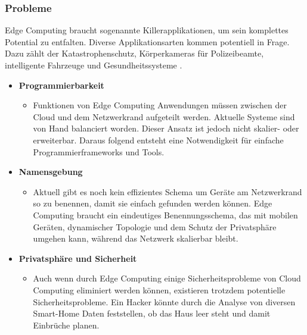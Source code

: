 \documentclass{sigchi}
\begin{document}
\subsubsection{Probleme}
Edge Computing braucht sogenannte Killerapplikationen, um sein komplettes Potential zu entfalten. Diverse Applikationsarten kommen potentiell in Frage. Dazu zählt der Katastrophenschutz, Körperkameras für Polizeibeamte, intelligente Fahrzeuge und Gesundheitssysteme \cite{promise-edge-computing:2016}.

\begin{itemize}
    \item \textbf{Programmierbarkeit}
    \begin{itemize}
        \item Funktionen von Edge Computing Anwendungen müssen zwischen der Cloud und dem Netzwerkrand aufgeteilt werden. Aktuelle Systeme sind von Hand balanciert worden. Dieser Ansatz ist jedoch nicht skalier- oder erweiterbar. Daraus folgend entsteht eine Notwendigkeit für einfache Programmierframeworks und Tools.
    \end{itemize}
    \item \textbf{Namensgebung}
        \begin{itemize}
            \item Aktuell gibt es noch kein effizientes Schema um Geräte am Netzwerkrand so zu benennen, damit sie einfach gefunden werden können. Edge Computing braucht ein eindeutiges Benennungsschema, das mit mobilen Geräten, dynamischer Topologie und dem Schutz der Privatsphäre umgehen kann, während das Netzwerk skalierbar bleibt.
        \end{itemize}
    \item \textbf{Privatsphäre und Sicherheit}
        \begin{itemize}
            \item Auch wenn durch Edge Computing einige Sicherheitsprobleme von Cloud Computing eliminiert werden können, existieren trotzdem potentielle Sicherheitsprobleme. Ein Hacker könnte durch die Analyse von diversen Smart-Home Daten feststellen, ob das Haus leer steht und damit Einbrüche planen.
        \end{itemize}
\end{itemize}
\end{document}
